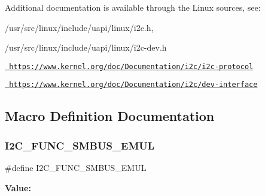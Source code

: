 Additional documentation is available through the Linux sources, see\+:


\begin{DoxyItemize}
\item /usr/src/linux/include/uapi/linux/i2c.h,
\item /usr/src/linux/include/uapi/linux/i2c-\/dev.h
\item \href{https://www.kernel.org/doc/Documentation/i2c/i2c-protocol}{\texttt{ https\+://www.\+kernel.\+org/doc/\+Documentation/i2c/i2c-\/protocol}}
\item \href{https://www.kernel.org/doc/Documentation/i2c/dev-interface}{\texttt{ https\+://www.\+kernel.\+org/doc/\+Documentation/i2c/dev-\/interface}} 
\end{DoxyItemize}

\subsection{Macro Definition Documentation}
\mbox{\label{group__I2CLinux_gadbeca6d437f12cbfab5ea8a96633e903}} 
\subsubsection{\texorpdfstring{I2C\_FUNC\_SMBUS\_EMUL}{I2C\_FUNC\_SMBUS\_EMUL}}
{\footnotesize\ttfamily \#define I2\+C\+\_\+\+F\+U\+N\+C\+\_\+\+S\+M\+B\+U\+S\+\_\+\+E\+M\+UL}

{\bfseries Value\+:}
\begin{DoxyCode}{0}

\end{DoxyCode}
\mbox{\label{group__I2CLinux_ga4c2f02700f22d4f76c670966aed5079a}} 
